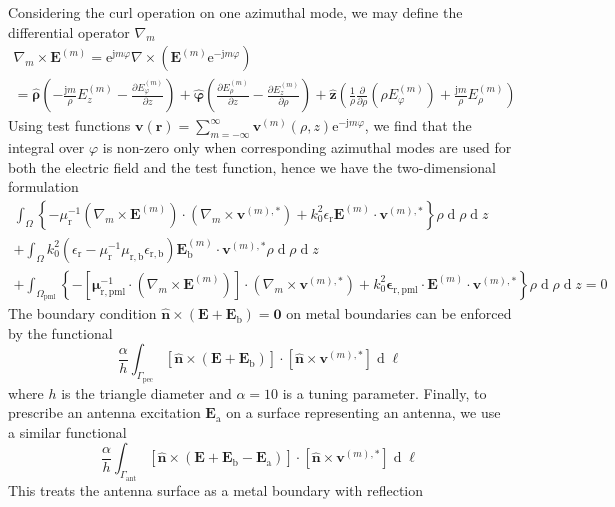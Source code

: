 \documentclass[a4paper,12pt]{article}
\renewcommand{\vec}[1]{\boldsymbol{#1}}
\newcommand{\unitvec}[1]{\hat{\vec{#1}}}
\newcommand{\mrm}[1]{\mathrm{#1}}
\newcommand{\diff}{\operatorname{d}\!}
\newcommand{\ju}{\mrm{j}}
\newcommand{\eu}{\mrm{e}}
\newcommand{\Ev}{\vec{E}}
\newcommand{\rv}{\vec{r}}
\newcommand{\Zv}{\vec{0}}
\newcommand{\zuv}{\unitvec{z}}
\newcommand{\nuv}{\unitvec{n}}
\newcommand{\rhouv}{\unitvec{\rho}}
\newcommand{\varphiuv}{\unitvec{\varphi}}
\newcommand{\vv}{\vec{v}}
\newcommand{\epsm}{\boldsymbol{\epsilon}}
\newcommand{\mum}{\boldsymbol{\mu}}
\begin{document}
Considering the curl operation on one azimuthal mode, we may define
the differential operator $\nabla_{m}$
\begin{multline}
  \nabla_{m}\times\Ev^{(m)} = \eu^{\ju m\varphi}\nabla\times(\Ev^{(m)}\eu^{-\ju m\varphi}) \\
  = \rhouv\left(-\frac{\ju m}{\rho}E_{z}^{(m)} - \frac{\partial E_{\varphi}^{(m)}}{\partial z}\right) + \varphiuv\left(\frac{\partial E_{\rho}^{(m)}}{\partial z} - \frac{\partial E_{z}^{(m)}}{\partial\rho}\right) + \zuv\left( \frac{1}{\rho}\frac{\partial}{\partial\rho}(\rho E_{\varphi}^{(m)}) + \frac{\ju m}{\rho}E_{\rho}^{(m)}\right)
\end{multline}
Using test functions
$\vv(\rv) = \sum_{m=-\infty}^{\infty}\vv^{(m)}(\rho,z)\eu^{-\ju
  m\varphi}$, we find that the integral over $\varphi$ is non-zero
only when corresponding azimuthal modes are used for both the electric
field and the test function, hence we have the two-dimensional
formulation
\begin{multline}
  \int_{\Omega} \left\{ - \mu_{\mrm{r}}^{-1}(\nabla_{m}\times\Ev^{(m)})\cdot(\nabla_{m}\times\vv^{(m),*}) + k_{0}^{2}\epsilon_{\mrm{r}}\Ev^{(m)}\cdot\vv^{(m),*} \right\} \rho\diff\rho\diff z \\
  + \int_{\Omega} k_{0}^{2} (\epsilon_{\mrm{r}}-\mu_{\mrm{r}}^{-1}\mu_{\mrm{r,b}}\epsilon_{\mrm{r,b}}) \Ev_{\mrm{b}}^{(m)}\cdot\vv^{(m),*} \rho\diff\rho\diff z \\
  + \int_{\Omega_{\mrm{pml}}} \left\{ -[\mum_{\mrm{r,pml}}^{-1}\cdot(\nabla_{m}\times\Ev^{(m)})]\cdot(\nabla_{m}\times\vv^{(m),*}) + k_{0}^{2} \epsm_{\mrm{r,pml}}\cdot\Ev^{(m)}\cdot\vv^{(m),*} \right\} \rho\diff\rho\diff z = 0
\end{multline}
The boundary condition $\nuv\times(\Ev + \Ev_{\mrm{b}}) = \Zv$ on
metal boundaries can be enforced by the functional
\begin{equation}
  \frac{\alpha}{h}\int_{\Gamma_{\mrm{pec}}} [\nuv\times(\Ev + \Ev_{\mrm{b}})] \cdot [\nuv\times\vv^{(m),*}] \diff\ell
\end{equation}
where $h$ is the triangle diameter and $\alpha=10$ is a tuning
parameter. 
Finally, to prescribe an antenna excitation $\Ev_{\mrm{a}}$ on a
surface representing an antenna, we use a similar functional
\begin{equation}
  \frac{\alpha}{h}\int_{\Gamma_{\mrm{ant}}} [\nuv\times(\Ev + \Ev_{\mrm{b}} - \Ev_{\mrm{a}})] \cdot [\nuv\times\vv^{(m),*}] \diff\ell
\end{equation}
This treats the antenna surface as a metal boundary with reflection
\end{document}
